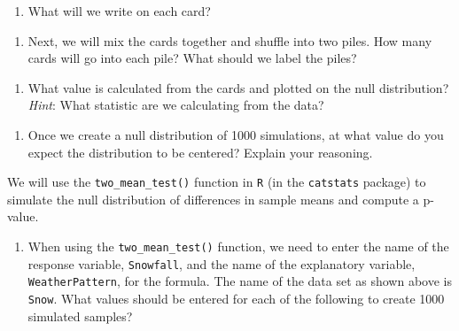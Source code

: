 \documentclass[
]{report}
\providecommand{\tightlist}{%
  \setlength{\itemsep}{0pt}\setlength{\parskip}{0pt}}
\begin{document}
\vspace{0.3in}

\begin{enumerate}
\def\labelenumi{\arabic{enumi}.}
\setcounter{enumi}{10}
\tightlist
\item
  What will we write on each card?
\end{enumerate}

\vspace{0.3in}

\begin{enumerate}
\def\labelenumi{\arabic{enumi}.}
\setcounter{enumi}{11}
\tightlist
\item
  Next, we will mix the cards together and shuffle into two piles. How many cards will go into each pile? What should we label the piles?
\end{enumerate}

\vspace{.8in}

\begin{enumerate}
\def\labelenumi{\arabic{enumi}.}
\setcounter{enumi}{12}
\tightlist
\item
  What value is calculated from the cards and plotted on the null distribution? \emph{Hint}: What statistic are we calculating from the data?
\end{enumerate}

\vspace{0.3in}

\begin{enumerate}
\def\labelenumi{\arabic{enumi}.}
\setcounter{enumi}{13}
\tightlist
\item
  Once we create a null distribution of 1000 simulations, at what value do you expect the distribution to be centered? Explain your reasoning.
\end{enumerate}

\vspace{.8in}

We will use the \texttt{two\_mean\_test()} function in \texttt{R} (in the \texttt{catstats} package) to simulate the null distribution of differences in sample means and compute a p-value.

\begin{enumerate}
\def\labelenumi{\arabic{enumi}.}
\setcounter{enumi}{14}
\tightlist
\item
  When using the \texttt{two\_mean\_test()} function, we need to enter the name of the response variable, \texttt{Snowfall}, and the name of the explanatory variable, \texttt{WeatherPattern}, for the formula. The name of the data set as shown above is \texttt{Snow}. What values should be entered for each of the following to create 1000 simulated samples?
\end{enumerate}
\end{document}
